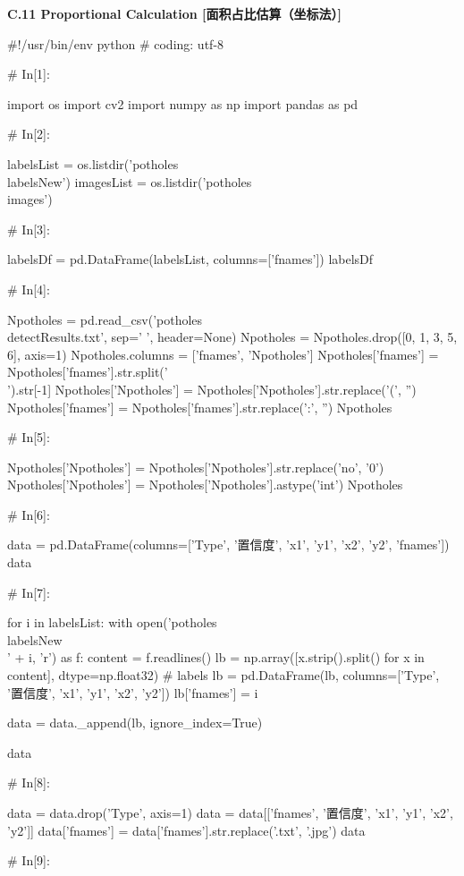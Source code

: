 \documentclass{MathorCupmodeling}
\begin{document}
\textbf{C.11 Proportional Calculation [面积占比估算（坐标法）]}
\begin{python}
#!/usr/bin/env python
# coding: utf-8

# In[1]:


import os
import cv2
import numpy as np
import pandas as pd

# In[2]:


labelsList = os.listdir('potholes\\labelsNew')
imagesList = os.listdir('potholes\\images')

# In[3]:


labelsDf = pd.DataFrame(labelsList, columns=['fnames'])
labelsDf

# In[4]:


Npotholes = pd.read_csv('potholes\\detectResults.txt', sep=' ', header=None)
Npotholes = Npotholes.drop([0, 1, 3, 5, 6], axis=1)
Npotholes.columns = ['fnames', 'Npotholes']
Npotholes['fnames'] = Npotholes['fnames'].str.split('\\').str[-1]
Npotholes['Npotholes'] = Npotholes['Npotholes'].str.replace('(', '')
Npotholes['fnames'] = Npotholes['fnames'].str.replace(':', '')
Npotholes

# In[5]:


Npotholes['Npotholes'] = Npotholes['Npotholes'].str.replace('no', '0')
Npotholes['Npotholes'] = Npotholes['Npotholes'].astype('int')
Npotholes

# In[6]:


data = pd.DataFrame(columns=['Type', '置信度', 'x1', 'y1', 'x2', 'y2', 'fnames'])
data

# In[7]:


for i in labelsList:
    with open('potholes\\labelsNew\\' + i, 'r') as f:
        content = f.readlines()
        lb = np.array([x.strip().split() for x in content], dtype=np.float32)  # labels
        lb = pd.DataFrame(lb, columns=['Type', '置信度', 'x1', 'y1', 'x2', 'y2'])
        lb['fnames'] = i

    data = data._append(lb, ignore_index=True)

data

# In[8]:


data = data.drop('Type', axis=1)
data = data[['fnames', '置信度', 'x1', 'y1', 'x2', 'y2']]
data['fnames'] = data['fnames'].str.replace('.txt', '.jpg')
data

# In[9]:



\end{python}
\end{document}
